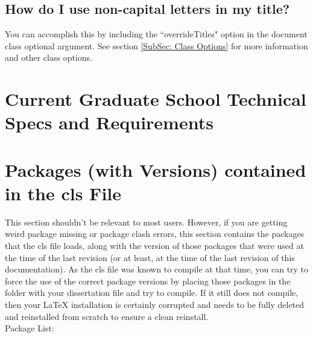 \documentclass{article}
\begin{document}
    \subsection{How do I use non-capital letters in my title?}
        You can accomplish this by including the ``overrideTitles" option in the document class optional argument. See section \ref{SubSec: Class Options} for more information and other class options.




\section{Current Graduate School Technical Specs and Requirements}

\section{Packages (with Versions) contained in the cls File}
    This section shouldn't be relevant to most users. However, if you are getting weird package missing or package clash errors, this section contains the packages that the cls file loads, along with the version of those packages that were used at the time of the last revision (or at least, at the time of the last revision of this documentation). As the cls file was known to compile at that time, you can try to force the use of the correct package versions by placing those packages in the folder with your dissertation file and try to compile. If it still does not compile, then your \LaTeX{} installation is certainly corrupted and needs to be fully deleted and reinstalled from scratch to ensure a clean reinstall.\\
    Package List:
\end{document}
